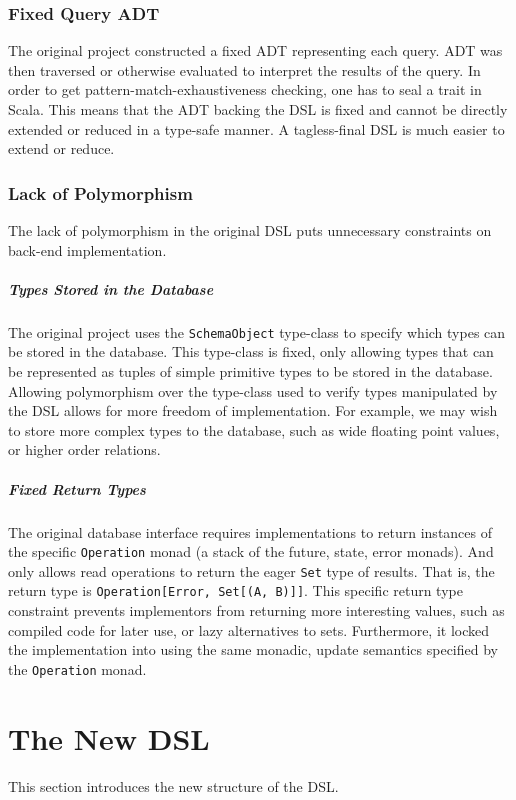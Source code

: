 \documentclass{report}
\newcommand \2[0]{\textbf{2}}
\newcommand \3[0]{\textbf{3}}
\begin{document}
\subsection{Fixed Query ADT}
The original project constructed a fixed ADT representing each query. ADT was then traversed or otherwise evaluated to interpret the results of the query. In order to get pattern-match-exhaustiveness checking, one has to seal a trait in Scala. This means that the ADT backing the DSL is fixed and cannot be directly extended or reduced in a type-safe manner. A tagless-final DSL is much easier to extend or reduce.

\subsection{Lack of Polymorphism}
The lack of polymorphism in the original DSL puts unnecessary constraints on back-end implementation.
\paragraph{Types Stored in the Database}
The original project uses the \texttt{SchemaObject} type-class to specify which types can be stored in the database. This type-class is fixed, only allowing types that can be represented as tuples of simple primitive types to be stored in the database. Allowing polymorphism over the type-class used to verify types manipulated by the DSL allows for more freedom of implementation. For example, we may wish to store more complex types to the database, such as wide floating point values, or higher order relations.

\paragraph{Fixed Return Types}
The original database interface requires implementations to return instances of the specific \texttt{Operation} monad (a stack of the future, state, error monads). And only allows read operations to return the eager \texttt{Set} type of results. That is, the return type is \texttt{Operation[Error, Set[(A, B)]]}. This specific return type constraint prevents implementors from returning more interesting values, such as compiled code for later use, or lazy alternatives to sets. Furthermore, it locked the implementation into using the same monadic, update semantics specified by the \texttt{Operation} monad.


\chapter{The New DSL}
This section introduces the new structure of the DSL.
\end{document}
